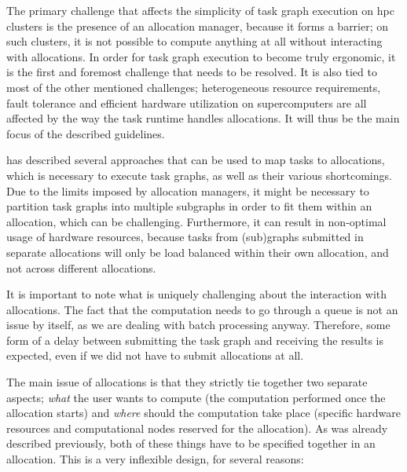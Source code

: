 The primary challenge that affects the simplicity of task graph execution on
\gls{hpc} clusters is the presence of an allocation manager, because it forms a
barrier; on such clusters, it is not possible to compute anything at all without interacting with
allocations. In order for task graph execution to become truly ergonomic, it is the first and
foremost challenge that needs to be resolved. It is also tied to most of the other mentioned
challenges; heterogeneous resource requirements, fault tolerance and efficient hardware utilization
on supercomputers are all affected by the way the task runtime handles allocations. It will thus be
the main focus of the described guidelines.

 has described several approaches that can be used to map tasks to
allocations, which is necessary to execute task graphs, as well as their various shortcomings. Due
to the limits imposed by allocation managers, it might be necessary to partition task graphs into
multiple subgraphs in order to fit them within an allocation, which can be challenging.
Furthermore, it can result in non-optimal usage of hardware resources, because tasks from
(sub)graphs submitted in separate allocations will only be load balanced within their own
allocation, and not across different allocations.

It is important to note what is uniquely challenging about the interaction with allocations. The
fact that the computation needs to go through a queue is not an issue by itself, as we are dealing
with batch processing anyway. Therefore, some form of a delay between submitting the task graph and
receiving the results is expected, even if we did not have to submit allocations at all.

The main issue of allocations is that they strictly tie together two separate aspects;
\emph{what} the user wants to compute (the computation performed once the allocation
starts) and \emph{where} should the computation take place (specific hardware resources
and computational nodes reserved for the allocation). As was already described previously, both of
these things have to be specified together in an allocation. This is a very inflexible design, for
several reasons:

